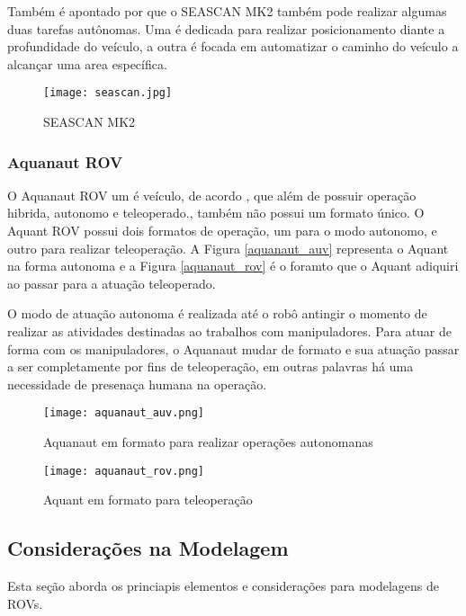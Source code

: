 Também é apontado por \cite{ECA_GROUP} que o SEASCAN MK2 também pode realizar algumas duas tarefas autônomas. Uma é dedicada para realizar posicionamento diante a profundidade do veículo, a outra é focada em automatizar o caminho do veículo a alcançar uma area específica.



\begin{figure}
  \centering 
  \texttt{[image: seascan.jpg]}
  \caption{SEASCAN MK2}
  \label{fig:seascan}
\end{figure}


\subsubsection{Aquanaut ROV}

O Aquanaut ROV um é veículo, de acordo \cite{Bogue1}, que além de possuir operação hibrida, autonomo e teleoperado., também não possui um formato único. O Aquant ROV possui dois formatos de operação, um para o modo autonomo, e outro para realizar teleoperação.
A Figura \ref{aquanaut_auv} representa o Aquant na forma autonoma e  a Figura \ref{aquanaut_rov} é o foramto que o Aquant adiquiri ao passar para a atuação teleoperado.

O modo de atuação autonoma é realizada até o robô antingir o momento de realizar as atividades destinadas ao trabalhos com manipuladores. Para atuar de forma com os manipuladores, o Aquanaut mudar de formato e sua atuação passar a ser completamente por fins de teleoperação, em outras palavras há uma necessidade de presenaça  humana na operação. 


\begin{figure}
  \centering 
  \texttt{[image: aquanaut\_auv.png]}
  \caption{Aquanaut em formato para realizar operações autonomanas}
  \label{fig:aquanaut_auv}
\end{figure}

\begin{figure}
  \centering 
  \texttt{[image: aquanaut\_rov.png]}
  \caption{Aquant em formato para teleoperação}
  \label{fig:aquanaut_rov}
\end{figure}



\subsection{Considerações na Modelagem}
Esta seção aborda os princiapis elementos e considerações para modelagens de ROVs.

